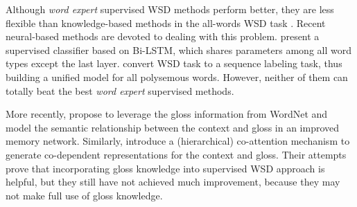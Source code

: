 \documentclass[11pt,a4paper]{article}
\begin{document}
Although \textit{word expert} supervised WSD methods perform better, they are less flexible than knowledge-based methods in the all-words WSD task \citep{raganato2017neural}. Recent neural-based methods are devoted to dealing with this problem. \citet{kaageback2016word} present a supervised classifier based on Bi-LSTM, which shares parameters among all word types except the last layer. \citet{raganato2017neural} convert WSD task to a sequence labeling task, thus building a unified model for all polysemous words.
However, neither of them can totally beat the best \textit{word expert} supervised methods.



More recently, \citet{luo2018incorporating} propose to leverage the gloss information from WordNet and model the semantic relationship between the context and gloss in an improved memory network. Similarly, \citet{luo2018leveraging} introduce a (hierarchical) co-attention mechanism to generate co-dependent representations for the context and gloss. Their attempts prove that incorporating gloss knowledge into supervised WSD approach is helpful, but they still have not achieved much improvement, because they may not make full use of gloss knowledge.
\end{document}

